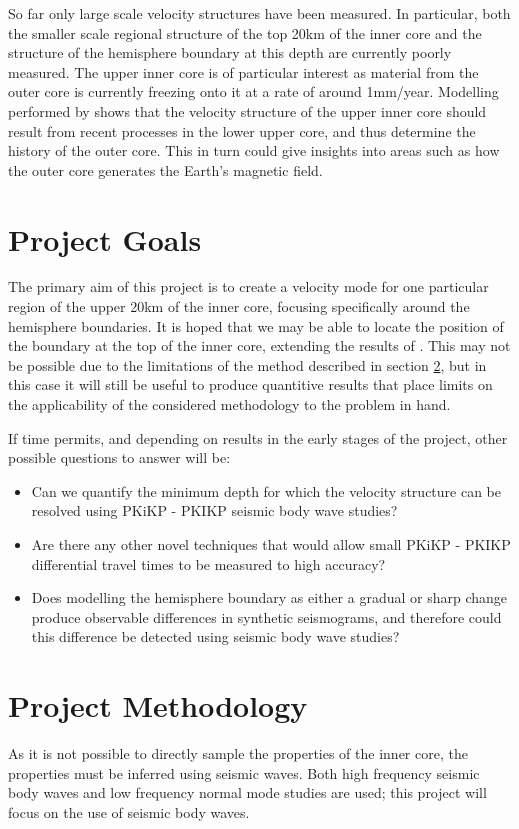 \documentclass[11pt,a4paper]{article}
\begin{document}
So far only large scale velocity structures have been measured. In particular, both the smaller scale regional structure of the top 20km of the inner core and the structure of the hemisphere boundary at this depth are currently poorly measured. The upper inner core is of particular interest as material from the outer core is currently freezing onto it at a rate of around 1mm/year. Modelling performed by \cite{Deguen2009a} shows that the velocity structure of the upper inner core should result from recent processes in the lower upper core, and thus determine the history of the outer core. This in turn could give insights into areas such as how the outer core generates the Earth's magnetic field.

\section{Project Goals}
\label{sec:Goals}
The primary aim of this project is to create a velocity mode for one particular region of the upper 20km of the inner core, focusing specifically around the hemisphere boundaries. It is hoped that we may be able to locate the position of the boundary at the top of the inner core, extending the results of \cite{Waszek2011b}. This may not be possible due to the limitations of the method described in section \ref{sec:Methodology}, but in this case it will still be useful to produce quantitive results that place limits on the applicability of the considered methodology to the problem in hand.

If time permits, and depending on results in the early stages of the project, other possible questions to answer will be:
\begin{itemize}
	\item Can we quantify the minimum depth for which the velocity structure can be resolved using PKiKP - PKIKP seismic body wave studies?
	\item Are there any other novel techniques that would allow small PKiKP - PKIKP differential travel times to be measured to high accuracy?
	\item Does modelling the hemisphere boundary as either a gradual or sharp change produce observable differences in synthetic seismograms, and therefore could this difference be detected using seismic body wave studies?
\end{itemize}

\section{Project Methodology}
\label{sec:Methodology}
As it is not possible to directly sample the properties of the inner core, the properties must be inferred using seismic waves. Both high frequency seismic body waves and low frequency normal mode studies are used; this project will focus on the use of seismic body waves. 
\end{document}
